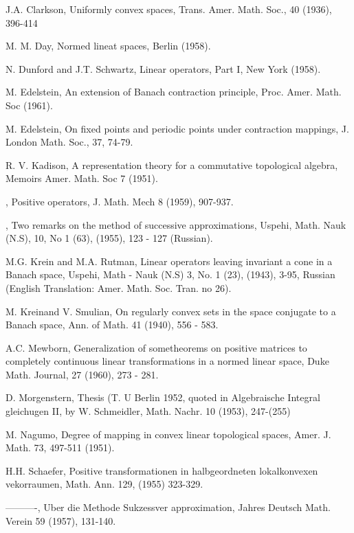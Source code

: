 \begin{thebibliography}{99}
 {J.A. Clarkson}, Uniformly convex spaces,
  Trans. Amer. Math. Soc., 40 (1936), 396-414 

 {M. M. Day}, Normed lineat spaces, Berlin (1958). 

 {N. Dunford and J.T. Schwartz}, Linear operators, Part
  I, New York (1958). 

 {M. Edelstein}, An extension of Banach contraction
  principle, Proc. Amer. Math. Soc (1961). 

 {M. Edelstein}, On fixed points and periodic points
  under contraction mappings, J. London Math. Soc.,  37, 74-79. 

 {R. V. Kadison}, A representation theory for a
  commutative topological algebra, Memoirs Amer. Math. Soc 7 (1951). 

, Positive operators, J. Math. Mech 8 (1959),
  907-937. 

, Two remarks on the method of
  successive	approximations, Uspehi, Math. Nauk (N.S), 10, No 1
  (63), (1955), 123 - 127 (Russian). 

 {M.G. Krein and M.A. Rutman}, Linear operators leaving
  invariant a cone in a Banach space, Uspehi, Math - Nauk (N.S) 3,
  No. 1 (23), (1943), 3-95, Russian (English Translation:
  Amer. Math. Soc. Tran. no 26). 

 {M. Krein\pageoriginale and V}. Smulian, On regularly
  convex sets in  the space conjugate to a Banach space, Ann. of
  Math. 41 (1940), 556 - 583. 

 {A.C. Mewborn}, Generalization of sometheorems on
  positive matrices to completely continuous linear transformations in
  a normed linear space, Duke Math. Journal, 27 (1960), 273 -
  281. 

 {D. Morgenstern}, Thesis (T. U Berlin 1952, quoted in
  Algebraische Integral gleichugen II, by W. Schmeidler,
  Math. Nachr. 10 (1953), 247-(255) 

 {M. Nagumo}, Degree of mapping in convex linear
  topological spaces, Amer. J. Math. 73, 497-511 (1951).  

 {H.H. Schaefer}, Positive transformationen in
  halbgeordneten lokalkonvexen vekorraumen, Math. Ann. 129, (1955)
  323-329. 

 {----------}, Uber die Methode Sukzessver approximation,
  Jahres Deutsch Math. Verein 59 (1957), 131-140. 


\end{thebibliography}
